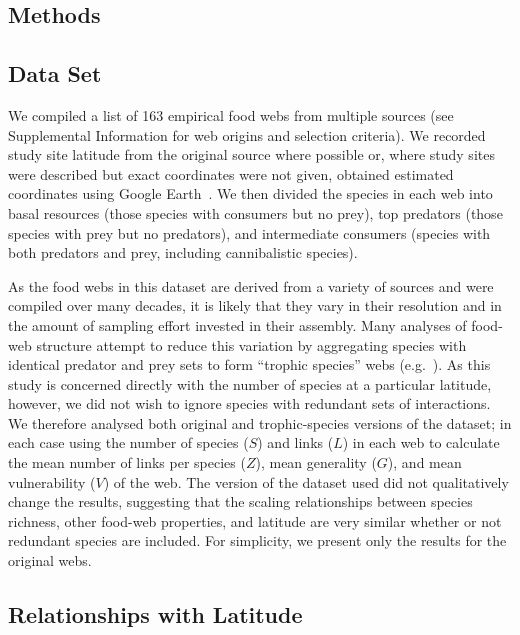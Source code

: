 \documentclass[12pt]{article}
\begin{document}
\begin{spacing}{1.0}
\section*{Methods}

  \subsection*{Data Set} 

    We compiled a list of 163 empirical food webs from
    multiple sources (see Supplemental Information for web origins and selection
    criteria). We recorded study site latitude from the original source where
    possible or, where study sites were described but exact coordinates were not
    given, obtained estimated coordinates using Google Earth~\citep{GoogleEarth}.
    We then divided the species in each web into basal resources (those species with
    consumers but no prey), top predators (those species with prey but no predators),
    and intermediate consumers (species with both predators and prey, including cannibalistic
    species). 


    As the food webs in this dataset are derived from a variety of sources and were compiled over many decades, it
    is likely that they vary in their resolution and in the amount of sampling effort invested in their assembly.
    Many analyses of food-web structure attempt to reduce this variation by aggregating species with identical predator and prey
    sets to form ``trophic species'' webs (e.g.~\citep{Martinez1991,Vermaat2009,Dunne2004,Dunne2013}). As this study
    is concerned directly with the number of species at a particular latitude, however, we did not wish to ignore 
    species with redundant sets of interactions. We therefore analysed both original and trophic-species versions
    of the dataset; in each case using the number of species ($S$) and 
    links ($L$) in each web to calculate the mean number of links per species ($Z$), mean generality 
    ($G$), and mean vulnerability ($V$) of the web. 
    The version of the dataset used did not qualitatively change the results, suggesting that
    the scaling relationships between species richness, other food-web properties, and latitude are very 
    similar whether or not redundant species are included. For simplicity, we present only
    the results for the original webs.


  \subsection*{Relationships with Latitude}


\end{spacing}
\end{document}
